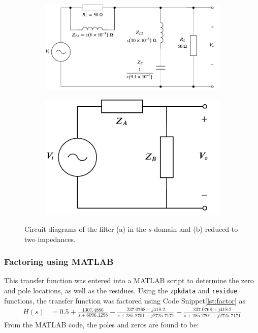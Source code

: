 \documentclass{homework}
\renewcommand{\lstlistingname}{Code Snippet}
\begin{document}
	\begin{figure}[h]
		\begin{subfigure}{0.68\linewidth}
			\centering
			\includegraphics[width=\linewidth]{projpre.pdf}
			\caption{}
		\end{subfigure}
		\begin{subfigure}{0.3\linewidth}
			\centering
			\includegraphics[width=\linewidth]{proj.pdf}
			\caption{}
		\end{subfigure}
		\caption{Circuit diagrams of the filter (a) in the $s$-domain and (b) reduced to two impedances.}
		\label{fig:poop}
	\end{figure}
	
	\pagebreak
	\subsubsection*{Factoring using MATLAB}
	This transfer function was entered into a MATLAB script to determine the zero and pole locations, as well as the residues. Using the \texttt{zpkdata} and \texttt{residue} functions, the transfer function was factored using \lstlistingname \space \ref{lst:factor} as
	\begin{align*}
		H(s) & = 0.5 + \frac{1307.4886}{s + 6096.1298}
			- \frac{237.0768-j418.2}{s + 285.2701-j2725.7171}
			- \frac{237.0768+j418.2}{s + 285.2701+j2725.7171}
	\end{align*}
	\noindent From the MATLAB code, the poles and zeros are found to be:
	
\end{document}
